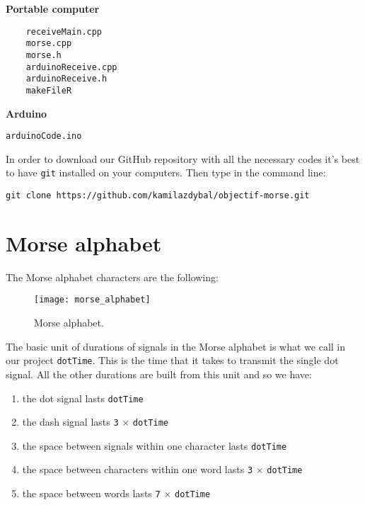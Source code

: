 \documentclass[12pt]{report}
\begin{document}
\textbf{Portable computer}

\begin{verbatim}
	receiveMain.cpp
	morse.cpp
	morse.h
	arduinoReceive.cpp
	arduinoReceive.h
	makeFileR
\end{verbatim}

\textbf{Arduino}

\begin{verbatim}
arduinoCode.ino
\end{verbatim}

In order to download our GitHub repository with all the necessary codes it's best to have \verb|git| installed on your computers. Then type in the command line:

\begin{snugshade}
\verb|git clone https://github.com/kamilazdybal/objectif-morse.git|
\end{snugshade}

\newpage

\section{Morse alphabet}  \label{sec:morse}

The Morse alphabet characters are the following:

\begin{figure}[H]
\centering\texttt{[image: morse\_alphabet]}
\caption{Morse alphabet.}			
\label{fig:morse_alphabet}
\end{figure}

The basic unit of durations of signals in the Morse alphabet is what we call in our project \verb|dotTime|. This is the time that it takes to transmit the single dot signal. All the other durations are built from this unit and so we have:

\begin{enumerate}
\item the dot signal lasts \verb|dotTime|

\item the dash signal lasts \verb|3| $\times$ \verb|dotTime|

\item the space between signals within one character lasts \verb|dotTime|

\item the space between characters within one word lasts \verb|3| $\times$ \verb|dotTime|

\item the space between words lasts \verb|7| $\times$ \verb|dotTime|

\end{enumerate}
\end{document}
